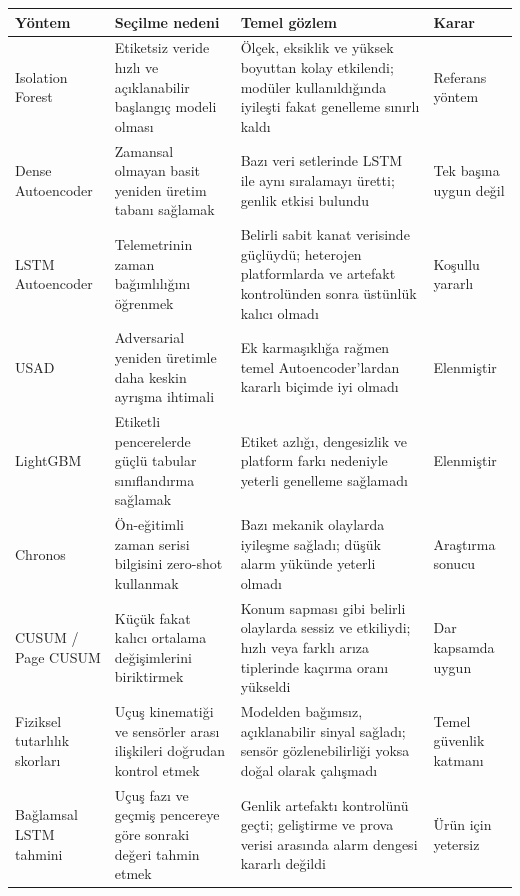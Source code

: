 \documentclass[11pt,a4paper]{article}
\begin{document}
\begin{longtable}{p{}p{}p{}p{}}
\toprule
\textbf{Yöntem} & \textbf{Seçilme nedeni} & \textbf{Temel gözlem} & \textbf{Karar} \\
\midrule
\endhead
Isolation Forest &
Etiketsiz veride hızlı ve açıklanabilir başlangıç modeli olması &
Ölçek, eksiklik ve yüksek boyuttan kolay etkilendi; modüler kullanıldığında
iyileşti fakat genelleme sınırlı kaldı &
Referans yöntem \\

Dense Autoencoder &
Zamansal olmayan basit yeniden üretim tabanı sağlamak &
Bazı veri setlerinde LSTM ile aynı sıralamayı üretti; genlik etkisi bulundu &
Tek başına uygun değil \\

LSTM Autoencoder &
Telemetrinin zaman bağımlılığını öğrenmek &
Belirli sabit kanat verisinde güçlüydü; heterojen platformlarda ve artefakt
kontrolünden sonra üstünlük kalıcı olmadı &
Koşullu yararlı \\

USAD &
Adversarial yeniden üretimle daha keskin ayrışma ihtimali &
Ek karmaşıklığa rağmen temel Autoencoder'lardan kararlı biçimde iyi olmadı &
Elenmiştir \\

LightGBM &
Etiketli pencerelerde güçlü tabular sınıflandırma sağlamak &
Etiket azlığı, dengesizlik ve platform farkı nedeniyle yeterli genelleme sağlamadı &
Elenmiştir \\

Chronos &
Ön-eğitimli zaman serisi bilgisini zero-shot kullanmak &
Bazı mekanik olaylarda iyileşme sağladı; düşük alarm yükünde yeterli olmadı &
Araştırma sonucu \\

CUSUM / Page CUSUM &
Küçük fakat kalıcı ortalama değişimlerini biriktirmek &
Konum sapması gibi belirli olaylarda sessiz ve etkiliydi; hızlı veya farklı
arıza tiplerinde kaçırma oranı yükseldi &
Dar kapsamda uygun \\

Fiziksel tutarlılık skorları &
Uçuş kinematiği ve sensörler arası ilişkileri doğrudan kontrol etmek &
Modelden bağımsız, açıklanabilir sinyal sağladı; sensör gözlenebilirliği yoksa
doğal olarak çalışmadı &
Temel güvenlik katmanı \\

Bağlamsal LSTM tahmini &
Uçuş fazı ve geçmiş pencereye göre sonraki değeri tahmin etmek &
Genlik artefaktı kontrolünü geçti; geliştirme ve prova verisi arasında alarm
dengesi kararlı değildi &
Ürün için yetersiz \\
\bottomrule
\end{longtable}
\end{document}
